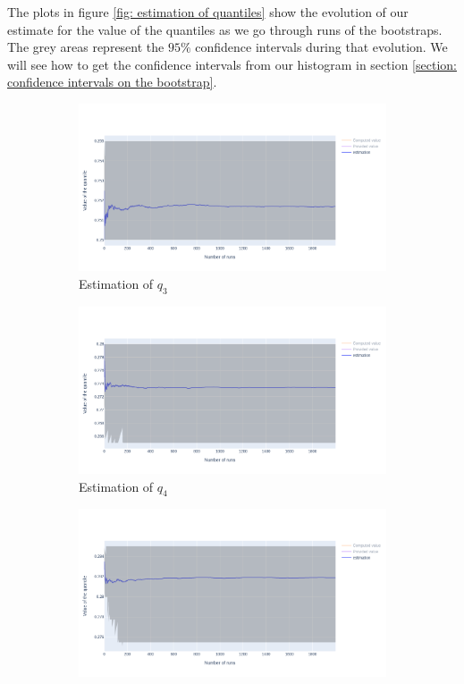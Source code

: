 \documentclass{article}
\begin{document}
The plots in figure \ref{fig: estimation of quantiles} show the evolution of our estimate for the value of the quantiles as we go through runs of the bootstraps. The grey areas represent the $95\%$ confidence intervals during that evolution. We will see how to get the confidence intervals from our histogram in section \ref{section: confidence intervals on the bootstrap}.

\begin{figure}
    \centering
    \begin{subfigure}{.84\textwidth}
        \includegraphics[width=\textwidth]{images/estimation_q3.png}
        \caption{Estimation of $q_3$}
    \end{subfigure}
    \hfill
    \begin{subfigure}{.84\textwidth}
        \includegraphics[width=\textwidth]{images/estimation_q4.png}
        \caption{Estimation of $q_4$}
    \end{subfigure}
    \hfill
    \begin{subfigure}{.84\textwidth}
        \includegraphics[width=\textwidth]{images/estimation_q5.png}

\end{subfigure}
\end{figure}
\end{document}
